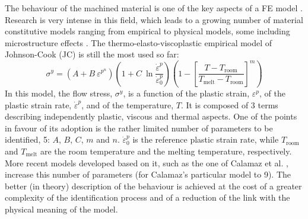 \documentclass[preprint,12pt,times]{elsarticle}
\begin{document}
The behaviour of the machined material is one of the key aspects of a FE model \cite{arrazola_Recent_2013, melkote_Advances_2017}. Research is very intense in this field, which leads to a growing number of material constitutive models ranging from empirical to physical models, some including microstructure effects \cite{melkote_Advances_2017}. The thermo-elasto-viscoplastic empirical model of Johnson-Cook (JC) \cite{johnson_Constitutive_1983} is still the most used so far:
%
\begin{equation}\label{eq:J-C}
	\sigma^{y} = \left(A + B\ \varepsilon^{p^n} \right) \left(1 + C\ \ln\frac{{\dot{\varepsilon}}^p}{\dot{\varepsilon}_{0}^{p}}\right) \left(1 - \left[\frac{T - T_{\text{room}}}{T_{\text{melt}} - T_{\text{room}}}\right]^{m}\right)
\end{equation}
%
In this model, the flow stress, $\sigma^{y}$, is a function of the plastic strain, $\varepsilon^{p}$, of the plastic strain rate, ${\dot{\varepsilon}}^{p}$, and of the temperature, $T$. It is composed of 3 terms describing independently plastic, viscous and thermal aspects. One of the points in favour of its adoption is the rather limited number of parameters to be identified, 5: $A$, $B$, $C$, $m$ and $n$. $\dot{\varepsilon}_{0}^{p}$ is the reference plastic strain rate, while $T_{\text{room}}$ and $T_{\text{melt}}$ are the room temperature and the melting temperature, respectively. More recent models developed based on it, such as the one of Calamaz et al. \cite{calamaz_New_2008}, increase this number of parameters (for Calamaz's particular model to 9). The better (in theory) description of the behaviour is achieved at the cost of a greater complexity of the identification process and of a reduction of the link with the physical meaning of the model.
\end{document}

